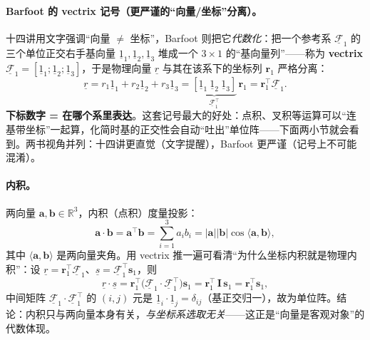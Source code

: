 \paragraph{Barfoot 的 vectrix 记号（更严谨的“向量/坐标”分离）。}十四讲用文字强调“向量 $\neq$ 坐标”，Barfoot\cite{barfoot2024state} 则把它\emph{代数化}：把一个参考系 $\underline{\mathcal{F}}_1$ 的三个单位正交右手基向量 $\underline{1}_1,\underline{1}_2,\underline{1}_3$ 堆成一个 $3\times1$ 的“基向量列”——称为 \textbf{vectrix} $\underline{\mathcal{F}}_1=[\underline{1}_1;\underline{1}_2;\underline{1}_3]$，于是物理向量 $\underline{r}$ 与其在该系下的坐标列 $\mathbf{r}_1$ 严格分离：
\begin{equation}
  \underline{r}=r_1\underline{1}_1+r_2\underline{1}_2+r_3\underline{1}_3
  =\underbrace{[\underline{1}_1\ \underline{1}_2\ \underline{1}_3]}_{\underline{\mathcal{F}}_1^\top}\,\mathbf{r}_1
  =\mathbf{r}_1^\top\underline{\mathcal{F}}_1 .
\end{equation}
\textbf{下标数字 = 在哪个系里表达}。这套记号最大的好处：点积、叉积等运算可以“连基带坐标”一起算，化简时基的正交性会自动“吐出”单位阵——下面两小节就会看到。两书视角并列：十四讲更直觉（文字提醒），Barfoot 更严谨（记号上不可能混淆）。

\paragraph{内积。}两向量 $\mathbf{a},\mathbf{b}\in\mathbb{R}^3$，内积（点积）度量投影：
\begin{equation}
  \mathbf{a}\cdot\mathbf{b}=\mathbf{a}^\top\mathbf{b}=\sum_{i=1}^3 a_ib_i=|\mathbf{a}||\mathbf{b}|\cos\langle\mathbf{a},\mathbf{b}\rangle,
  \label{eq:rb-dot}
\end{equation}
其中 $\langle\mathbf{a},\mathbf{b}\rangle$ 是两向量夹角。用 vectrix 推一遍可看清“为什么坐标内积就是物理内积”：设 $\underline{r}=\mathbf{r}_1^\top\underline{\mathcal{F}}_1$、$\underline{s}=\underline{\mathcal{F}}_1^\top\mathbf{s}_1$，则
\begin{equation}
  \underline{r}\cdot\underline{s}
  =\mathbf{r}_1^\top\Big(\underline{\mathcal{F}}_1\cdot\underline{\mathcal{F}}_1^\top\Big)\mathbf{s}_1
  =\mathbf{r}_1^\top\,\mathbf{I}\,\mathbf{s}_1=\mathbf{r}_1^\top\mathbf{s}_1,
\end{equation}
中间矩阵 $\underline{\mathcal{F}}_1\cdot\underline{\mathcal{F}}_1^\top$ 的 $(i,j)$ 元是 $\underline{1}_i\cdot\underline{1}_j=\delta_{ij}$（基正交归一），故为单位阵。结论：内积只与两向量本身有关，\emph{与坐标系选取无关}——这正是“向量是客观对象”的代数体现。

